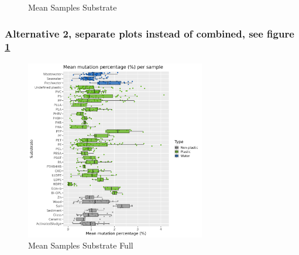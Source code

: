 \begin{figure}[h]
    \centering
    \caption{Mean Samples Substrate}
    \label{both_mean_samples_susbtrates}
\end{figure}

\subsubsection{Alternative 2, separate plots instead of combined, see figure \ref{both_mean_samples_susbtrates}}
\begin{figure}[h]
    \centering
    \includegraphics[width = 0.7\textwidth]{figure/mean_samples_substrate.png}
    \caption{Mean Samples Substrate Full}
    \label{mean_samples_substrate_full}
\end{figure}

